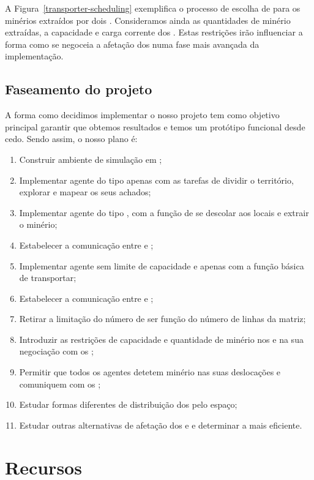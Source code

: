 \documentclass[12pt]{report}
\begin{document}
A Figura~\ref{transporter-scheduling} exemplifica o processo de escolha de \transporters para os minérios extraídos por dois \producers. Consideramos ainda as quantidades de minério extraídas, a capacidade e carga corrente dos \transporters. Estas restrições irão influenciar a forma como se negoceia a afetação dos \transporters numa fase mais avançada da implementação.

\section{Faseamento do projeto}

A forma como decidimos implementar o nosso projeto tem como objetivo principal garantir que obtemos resultados e temos um protótipo funcional desde cedo. Sendo assim, o nosso plano é:
\begin{enumerate}
	\item Construir ambiente de simulação em \repast;
	\item Implementar agente do tipo \spotter apenas com as tarefas de dividir o território, explorar e mapear os seus achados;
    \item Implementar agente do tipo \producer, com a função de se descolar aos locais e extrair o minério; 
	\item Estabelecer a comunicação entre \spotters e \producers;
	\item Implementar agente \transporter sem limite de capacidade e apenas com a função básica de transportar;
	\item Estabelecer a comunicação entre \producers e \transporters;
	\item Retirar a limitação do número de \spotters ser função do número de linhas da matriz;
	\item Introduzir as restrições de capacidade e quantidade de minério nos \transporters e na sua negociação com os \producers;
	\item Permitir que todos os agentes detetem minério nas suas deslocações e comuniquem com os \spotters;
	\item Estudar formas diferentes de distribuição dos \spotters pelo espaço;
	\item Estudar outras alternativas de afetação dos \producers e \transporters e determinar a mais eficiente.
\end{enumerate}

\chapter{Recursos}
\end{document}

